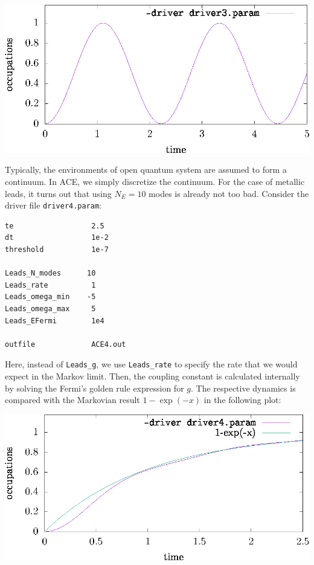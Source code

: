 \documentclass{scrartcl}
\begin{document}
\includegraphics[width=20cm]{figs/plot_hopping_N2.eps}


Typically, the environments of open quantum system are assumed to form 
a continuum. In ACE, we simply discretize the continuum. For the case 
of metallic leads, it turns out that using $N_E=10$ modes is already
not too bad. 
Consider the driver file \verb+driver4.param+:

\noindent\makebox[5cm]{\rule{7cm}{0.4pt}}
\begin{verbatim}
te                  2.5
dt                  1e-2
threshold           1e-7

Leads_N_modes      10
Leads_rate          1 
Leads_omega_min    -5
Leads_omega_max     5
Leads_EFermi        1e4

outfile             ACE4.out
\end{verbatim}
\noindent\makebox[5cm]{\rule{7cm}{0.4pt}}

Here, instead of \verb+Leads_g+, we use \verb+Leads_rate+ to specify the 
rate that we would expect in the Markov limit. Then, the coupling constant  
is calculated internally by solving the Fermi's golden rule expression for $g$.
The respective dynamics is compared with the Markovian result
$1-\exp(-x)$ in the following plot:

\includegraphics[width=20cm]{figs/plot_hopping_N10.eps}
\end{document}
